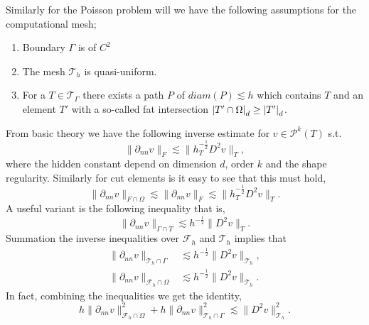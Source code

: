 Similarly for the Poisson problem will we have the following assumptions for the computational mesh;

\begin{enumerate}[label=\textbf{S.\arabic*}]
    \item\label{as:s1} Boundary $\Gamma $ is of $C^2$
    \item\label{as:s2} The mesh $\mathcal{T} _{h}$ is quasi-uniform.
    \item \label{as:s3}For a $T \in \mathcal{T} _{\Gamma }$ there exists a path $P$ of $diam(P) \lesssim h$ which contains $T$ and an element $T'$ with a so-called fat intersection $
    \left\lvert  T' \cap \Omega   \right\rvert _{d} \ge \left\lvert  T'  \right\rvert _{d}$.
\end{enumerate}

From basic theory we have the following inverse estimate for $ v \in \mathcal{P}^{k}( T)$ s.t. \[
     \| \partial _{nn}  v \|_{F   }^{ }  \lesssim  \| h_{T}^{-\frac{1}{2}} D ^2 v \|_{ T }^{  },
\]
where the hidden constant depend on dimension $d$, order $k$ and the shape regularity. Similarly for cut elements is it easy to see that this must hold,
\begin{equation*}
     \| \partial _{nn}  v \|_{F \cap \Omega    }^{  }  \lesssim\| \partial _{nn}  v \|_{F }^{  }  \lesssim   \| h_{T}^{-\frac{1}{2}} D ^2 v \|_{ T }^{  }.
\end{equation*}
A useful variant is the following inequality that is,
\begin{equation*}
\| \partial _{nn} v \|_{ \Gamma \cap T  }^{  } \lesssim h^{-\frac{1}{2}} \| D^2 v \|_{ T }^{  }.
\end{equation*}
Summation the inverse inequalities over $\mathcal{F}_{h} $ and $\mathcal{T}_{h} $ implies that
\begin{align}
\label{eq:bi_cut_inverse_1}
\| \partial _{nn} v \|_{ \mathcal{T} _{h} \cap \Gamma  }^{  } &\lesssim h^{-\frac{1}{2}} \| D^2 v \|_{ \mathcal{T}_h }^{  }, \\
\label{eq:bi_cut_inverse_2}
\| \partial _{nn}  v \|_{ \mathcal{F}_h \cap \Omega    }^{  }  &  \lesssim   h^{-\frac{1}{2}} \| D^2 v \|_{ \mathcal{T}_h  }^{  }.
\end{align}
In fact, combining the inequalities we get the identity,
\begin{equation}
\label{eq:bi_identity}
h\| \partial _{nn}  v \|_{ \mathcal{F}_h \cap \Omega    }^{2 } + h\| \partial _{nn} v \|_{ \mathcal{T} _{h} \cap \Gamma  }^{2  } \lesssim \| D^2 v \|_{ \mathcal{T} _{h}  }^{2  }.
\end{equation}

